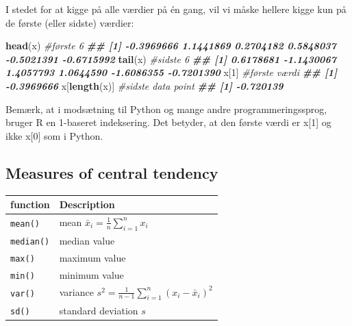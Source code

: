\documentclass[
]{book}
\newenvironment{Shaded}{\begin{snugshade}}{\end{snugshade}}
\newcommand{\CommentTok}[1]{\textcolor[rgb]{0.56,0.35,0.01}{\textit{#1}}}
\newcommand{\DecValTok}[1]{\textcolor[rgb]{0.00,0.00,0.81}{#1}}
\newcommand{\DocumentationTok}[1]{\textcolor[rgb]{0.56,0.35,0.01}{\textbf{\textit{#1}}}}
\newcommand{\FunctionTok}[1]{\textcolor[rgb]{0.13,0.29,0.53}{\textbf{#1}}}
\newcommand{\NormalTok}[1]{#1}
\begin{document}
I stedet for at kigge på alle værdier på én gang, vil vi måske hellere kigge kun på de første (eller sidste) værdier:

\begin{Shaded}
\begin{Highlighting}[]
\FunctionTok{head}\NormalTok{(x) }\CommentTok{\#første 6}
\DocumentationTok{\#\# [1] {-}0.3969666  1.1441869  0.2704182  0.5848037 {-}0.5021391 {-}0.6715992}
\FunctionTok{tail}\NormalTok{(x) }\CommentTok{\#sidste 6}
\DocumentationTok{\#\# [1]  0.6178681 {-}1.1430067  1.4057793  1.0644590 {-}1.6086355 {-}0.7201390}
\NormalTok{x[}\DecValTok{1}\NormalTok{] }\CommentTok{\#første værdi}
\DocumentationTok{\#\# [1] {-}0.3969666}
\NormalTok{x[}\FunctionTok{length}\NormalTok{(x)] }\CommentTok{\#sidste data point}
\DocumentationTok{\#\# [1] {-}0.720139}
\end{Highlighting}
\end{Shaded}

Bemærk, at i modsætning til Python og mange andre programmeringssprog, bruger R en 1-baseret indeksering. Det betyder, at den første værdi er x{[}1{]} og ikke x{[}0{]} som i Python.

\subsection{Measures of central tendency}\label{measures-of-central-tendency}

\begin{longtable}[]{@{}
  >{\raggedright\arraybackslash}p{}
  >{\raggedright\arraybackslash}p{}@{}}
\toprule\noalign{}
\begin{minipage}[b]{\linewidth}\raggedright
function
\end{minipage} & \begin{minipage}[b]{\linewidth}\raggedright
Description
\end{minipage} \\
\midrule\noalign{}
\endhead
\bottomrule\noalign{}
\endlastfoot
\texttt{mean()} & mean \(\bar{x}_{i} = \frac{1}{n}\sum_{i=1}^{n} x_{i}\) \\
\texttt{median()} & median value \\
\texttt{max()} & maximum value \\
\texttt{min()} & minimum value \\
\texttt{var()} & variance \(s^2 = \frac{1}{n-1}\sum_{i=1}^{n} (x_{i} - \bar{x}_{i})^2\) \\
\texttt{sd()} & standard deviation \(s\) \\
\end{longtable}
\end{document}
